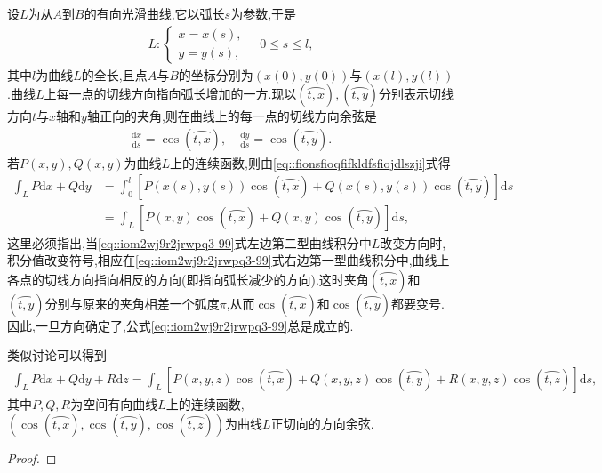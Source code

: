 \documentclass[../../main.tex]{subfiles}%
\begin{document}
\begin{theorem}[两类曲线积分的联系]
设$L$为从$A$到$B$的有向光滑曲线,它以弧长$s$为参数,于是
\begin{align*}
L:\begin{cases} x = x(s), \\ y = y(s), \end{cases} \quad 0 \leqslant s \leqslant l,
\end{align*}
其中$l$为曲线$L$的全长,且点$A$与$B$的坐标分别为$(x(0),y(0))$与$(x(l),y(l))$.曲线$L$上每一点的切线方向指向弧长增加的一方.现以$(\wideparen{t,x}),(\wideparen{t,y})$分别表示切线方向$t$与$x$轴和$y$轴正向的夹角,则在曲线上的每一点的切线方向余弦是
\begin{align}
\frac{\mathrm{d}x}{\mathrm{d}s} = \cos(\wideparen{t,x}),\quad \frac{\mathrm{d}y}{\mathrm{d}s} = \cos(\wideparen{t,y}). \label{8}
\end{align}
若$P(x,y),Q(x,y)$为曲线$L$上的连续函数,则由\eqref{eq::fionsfioqfifkldfsfiojdlszji}式得
\begin{align}
\int_L P\mathrm{d}x + Q\mathrm{d}y
&= \int_0^l \left[ P(x(s),y(s))\cos(\wideparen{t,x}) + Q(x(s),y(s))\cos(\wideparen{t,y}) \right] \mathrm{d}s\nonumber \\
&= \int_L \left[ P(x,y)\cos(\wideparen{t,x}) + Q(x,y)\cos(\wideparen{t,y}) \right] \mathrm{d}s,\label{eq::iom2wj9r2jrwpq3-99}
\end{align}
这里必须指出,当\eqref{eq::iom2wj9r2jrwpq3-99}式左边第二型曲线积分中$L$改变方向时,积分值改变符号,相应在\eqref{eq::iom2wj9r2jrwpq3-99}式右边第一型曲线积分中,曲线上各点的切线方向指向相反的方向(即指向弧长减少的方向).这时夹角$(\wideparen{t,x})$和$(\wideparen{t,y})$分别与原来的夹角相差一个弧度$\pi$,从而$\cos(\wideparen{t,x})$和$\cos(\wideparen{t,y})$都要变号.因此,一旦方向确定了,公式\eqref{eq::iom2wj9r2jrwpq3-99}总是成立的.

类似讨论可以得到
\begin{align*}
\int_L P\mathrm{d}x + Q\mathrm{d}y + R\mathrm{d}z
= \int_L \left[ P(x,y,z)\cos(\wideparen{t,x}) + Q(x,y,z)\cos(\wideparen{t,y}) + R(x,y,z)\cos(\wideparen{t,z}) \right] \mathrm{d}s,
\end{align*}
其中$P,Q,R$为空间有向曲线$L$上的连续函数,$(\cos(\wideparen{t,x}),\cos(\wideparen{t,y}),\cos(\wideparen{t,z}))$为曲线$L$正切向的方向余弦.
\end{theorem}
\begin{proof}



\end{proof}
\end{document}

